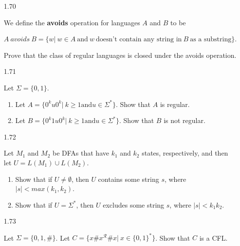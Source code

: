 \begin{enumerate}

      \item [1.70]

            We define the \textbf{avoids} operation for languages $A$ and $B$ to be

            $A ~avoids~ B = \{w|~w \in A ~\text{and} ~w~ \text{doesn’t contain any string in}~ B~ \text{as a substring}\}$.

            Prove that the class of regular languages is closed under the avoids operation.

      \item [1.71]

            Let $\Sigma =\{0,1\}$.

            \begin{enumerate}
                  \item Let $A =\{0^k u 0^k|~k \ge 1 \text{and} u \in \Sigma^\ast\}$. Show that $A$ is regular.
                  \item Let $B =\{0^k 1u0^k|~k \ge 1 \text{and} u \in \Sigma^\ast\}$. Show that $B$ is not regular.
            \end{enumerate}

      \item [1.72]

            Let $M_1$ and $M_2$ be DFAs that have $k_1$ and $k_2$ states, respectively, and then let
            $U = L(M_1) \cup L(M_2)$.
            \begin{enumerate}
                  \item Show that if $U \neq \emptyset$, then $U$ contains some string $s$, where $|s| < max(k_1,k_2)$.
                  \item Show that if $U=\Sigma^\ast$, then $U$ excludes some string $s$, where $|s| < k_1 k_2$.
            \end{enumerate}

      \item [1.73]

            Let $\Sigma =\{0,1,\#\}$. Let $C = \{x\#x^\mathcal{R}\#x|~x \in \{0,1\}^\ast\}$. Show that $C$ is a CFL.



\end{enumerate}
